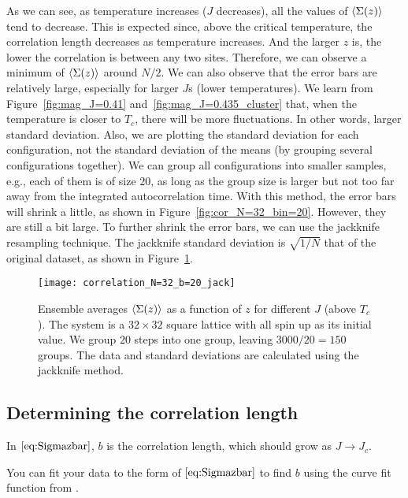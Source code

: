 As we can see, as temperature increases (\(J\) decreases), all the values of
\(\expval{\Sigma(z)}\) tend to decrease.
This is expected since, above the critical temperature, the correlation length
decreases as temperature increases.
And the larger \(z\) is, the lower the correlation is between any two sites.
Therefore, we can observe a minimum of \(\expval{\Sigma(z)}\) around \(N / 2\).
We can also observe that the error bars are relatively large, especially for
larger \(J\)s (lower temperatures).
We learn from Figure~\ref{fig:mag_J=0.41} and~\ref{fig:mag_J=0.435_cluster}
that, when the temperature is closer to \(T_c\), there will be more fluctuations.
In other words, larger standard deviation.
Also, we are plotting the standard deviation for each configuration,
not the standard deviation of the means (by grouping several configurations together).
We can group all configurations into smaller samples, e.g., each of them
is of size \(20\), as long as the group size is larger but not too far away from
the integrated autocorrelation time. With this method, the error bars will shrink
a little, as shown in Figure~\ref{fig:cor_N=32_bin=20}.
However, they are still a bit large. To further shrink the error bars,
we can use the jackknife resampling technique.
The jackknife standard deviation is \(\sqrt{1 / N}\) that of the original dataset,
as shown in Figure~\ref{fig:cor_N=32_bin=20_jack}.

\begin{figure}
    \centering
    \texttt{[image: correlation\_N=32\_b=20\_jack]}
    \caption{Ensemble averages \(\expval{\Sigma(z)}\) as a function of \(z\) for different
        \(J\) (above \(T_c\)). The system is a \(32 \times 32\) square lattice
        with all spin up as its initial value.
        We group \(20\) steps into one group, leaving \(3000 / 20 = 150\) groups.
        The data and standard deviations are calculated using the jackknife method.}
    \label{fig:cor_N=32_bin=20_jack}
\end{figure}

\subsection{Determining the correlation length}

In \(\eqref{eq:Sigmazbar}\), \(b\) is the correlation length, which should grow as
\(J \to J_c\).

\Question{} You can fit your data to the form of \(\eqref{eq:Sigmazbar}\) to find \(b\)
using the curve fit function  from
\href{https://github.com/JuliaNLSolvers/LsqFit.jl}{}.

